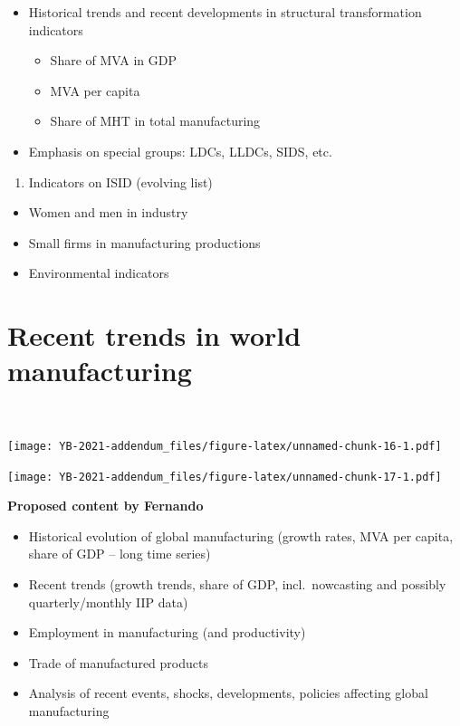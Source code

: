 \documentclass[
  openany, nofonts]{tufte-book}
\providecommand{\tightlist}{%
  \setlength{\itemsep}{0pt}\setlength{\parskip}{0pt}}
\begin{document}
\begin{itemize}
\tightlist
\item
  Historical trends and recent developments in structural transformation indicators

  \begin{itemize}
  \tightlist
  \item
    Share of MVA in GDP
  \item
    MVA per capita
  \item
    Share of MHT in total manufacturing
  \end{itemize}
\item
  Emphasis on special groups: LDCs, LLDCs, SIDS, etc.
\end{itemize}

\begin{enumerate}
\def\labelenumi{(\arabic{enumi})}
\setcounter{enumi}{6}
\tightlist
\item
  Indicators on ISID (evolving list)
\end{enumerate}

\begin{itemize}
\tightlist
\item
  Women and men in industry
\item
  Small firms in manufacturing productions
\item
  Environmental indicators
\end{itemize}

\hypertarget{recent}{%
\chapter{Recent trends in world manufacturing}\label{recent}}

~

\begin{marginfigure}
\texttt{[image: YB-2021-addendum\_files/figure-latex/unnamed-chunk-16-1.pdf]} \end{marginfigure}

\begin{marginfigure}
\texttt{[image: YB-2021-addendum\_files/figure-latex/unnamed-chunk-17-1.pdf]} \end{marginfigure}

\vspace*{-1.5cm}

\textbf{Proposed content by Fernando}

\begin{itemize}
\tightlist
\item
  Historical evolution of global manufacturing (growth rates, MVA per capita, share of GDP -- long time series)
\item
  Recent trends (growth trends, share of GDP, incl.~nowcasting and possibly quarterly/monthly IIP data)
\item
  Employment in manufacturing (and productivity)
\item
  Trade of manufactured products
\item
  Analysis of recent events, shocks, developments, policies affecting global manufacturing
\end{itemize}
\end{document}
